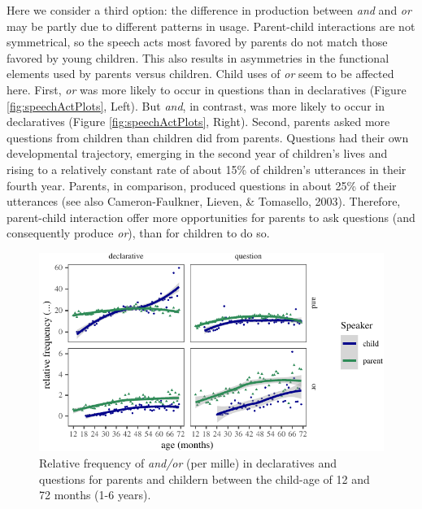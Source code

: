 \documentclass[
  ,man,floatsintext]{apa6}
\begin{document}
Here we consider a third option: the difference in production between \emph{and} and \emph{or} may be partly due to different patterns in usage. Parent-child interactions are not symmetrical, so the speech acts most favored by parents do not match those favored by young children. This also results in asymmetries in the functional elements used by parents versus children. Child uses of \emph{or} seem to be affected here. First, \emph{or} was more likely to occur in questions than in declaratives (Figure \ref{fig:speechActPlots}, Left). But \emph{and}, in contrast, was more likely to occur in declaratives (Figure \ref{fig:speechActPlots}, Right). Second, parents asked more questions from children than children did from parents. Questions had their own developmental trajectory, emerging in the second year of children's lives and rising to a relatively constant rate of about 15\% of children's utterances in their fourth year. Parents, in comparison, produced questions in about 25\% of their utterances (see also Cameron-Faulkner, Lieven, \& Tomasello, 2003). Therefore, parent-child interaction offer more opportunities for parents to ask questions (and consequently produce \emph{or}), than for children to do so.

\begin{figure}[H]

{\centering \includegraphics{figs/ageSpeechActPlot-1} 

}

\caption{Relative frequency of \textit{and/or} (per mille) in declaratives and questions for parents and childern between the child-age of 12 and 72 months (1-6 years).}\label{fig:ageSpeechActPlot}
\end{figure}
\end{document}
